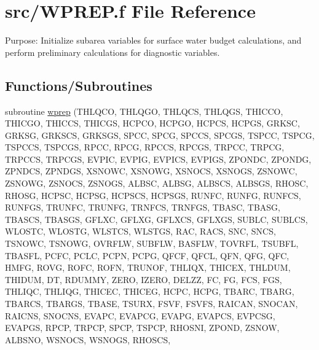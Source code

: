 \hypertarget{WPREP_8f}{}\section{src/\+W\+P\+R\+E\+P.f File Reference}
\label{WPREP_8f}


Purpose\+: Initialize subarea variables for surface water budget calculations, and perform preliminary calculations for diagnostic variables.  


\subsection*{Functions/\+Subroutines}
\begin{DoxyCompactItemize}
\item 
subroutine \hyperlink{WPREP_8f_a8bd6e495bd4674e569184609d67fa736}{wprep} (T\+H\+L\+Q\+C\+O, T\+H\+L\+Q\+G\+O, T\+H\+L\+Q\+C\+S, T\+H\+L\+Q\+G\+S, T\+H\+I\+C\+C\+O, T\+H\+I\+C\+G\+O, T\+H\+I\+C\+C\+S, T\+H\+I\+C\+G\+S, H\+C\+P\+C\+O, H\+C\+P\+G\+O, H\+C\+P\+C\+S, H\+C\+P\+G\+S, G\+R\+K\+S\+C, G\+R\+K\+S\+G, G\+R\+K\+S\+C\+S, G\+R\+K\+S\+G\+S, S\+P\+C\+C, S\+P\+C\+G, S\+P\+C\+C\+S, S\+P\+C\+G\+S, T\+S\+P\+C\+C, T\+S\+P\+C\+G, T\+S\+P\+C\+C\+S, T\+S\+P\+C\+G\+S, R\+P\+C\+C, R\+P\+C\+G, R\+P\+C\+C\+S, R\+P\+C\+G\+S, T\+R\+P\+C\+C, T\+R\+P\+C\+G, T\+R\+P\+C\+C\+S, T\+R\+P\+C\+G\+S, E\+V\+P\+I\+C, E\+V\+P\+I\+G, E\+V\+P\+I\+C\+S, E\+V\+P\+I\+G\+S, Z\+P\+O\+N\+D\+C, Z\+P\+O\+N\+D\+G, Z\+P\+N\+D\+C\+S, Z\+P\+N\+D\+G\+S, X\+S\+N\+O\+W\+C, X\+S\+N\+O\+W\+G, X\+S\+N\+O\+C\+S, X\+S\+N\+O\+G\+S, Z\+S\+N\+O\+W\+C, Z\+S\+N\+O\+W\+G, Z\+S\+N\+O\+C\+S, Z\+S\+N\+O\+G\+S, A\+L\+B\+S\+C, A\+L\+B\+S\+G, A\+L\+B\+S\+C\+S, A\+L\+B\+S\+G\+S, R\+H\+O\+S\+C, R\+H\+O\+S\+G, H\+C\+P\+S\+C, H\+C\+P\+S\+G, H\+C\+P\+S\+C\+S, H\+C\+P\+S\+G\+S, R\+U\+N\+F\+C, R\+U\+N\+F\+G, R\+U\+N\+F\+C\+S, R\+U\+N\+F\+G\+S, T\+R\+U\+N\+F\+C, T\+R\+U\+N\+F\+G, T\+R\+N\+F\+C\+S, T\+R\+N\+F\+G\+S, T\+B\+A\+S\+C, T\+B\+A\+S\+G, T\+B\+A\+S\+C\+S, T\+B\+A\+S\+G\+S, G\+F\+L\+X\+C, G\+F\+L\+X\+G, G\+F\+L\+X\+C\+S, G\+F\+L\+X\+G\+S, S\+U\+B\+L\+C, S\+U\+B\+L\+C\+S, W\+L\+O\+S\+T\+C, W\+L\+O\+S\+T\+G, W\+L\+S\+T\+C\+S, W\+L\+S\+T\+G\+S, R\+A\+C, R\+A\+C\+S, S\+N\+C, S\+N\+C\+S, T\+S\+N\+O\+W\+C, T\+S\+N\+O\+W\+G, O\+V\+R\+F\+L\+W, S\+U\+B\+F\+L\+W, B\+A\+S\+F\+L\+W, T\+O\+V\+R\+F\+L, T\+S\+U\+B\+F\+L, T\+B\+A\+S\+F\+L, P\+C\+F\+C, P\+C\+L\+C, P\+C\+P\+N, P\+C\+P\+G, Q\+F\+C\+F, Q\+F\+C\+L, Q\+F\+N, Q\+F\+G, Q\+F\+C, H\+M\+F\+G, R\+O\+V\+G, R\+O\+F\+C, R\+O\+F\+N, T\+R\+U\+N\+O\+F, T\+H\+L\+I\+Q\+X, T\+H\+I\+C\+E\+X, T\+H\+L\+D\+U\+M, T\+H\+I\+D\+U\+M, D\+T, R\+D\+U\+M\+M\+Y, Z\+E\+R\+O, I\+Z\+E\+R\+O, D\+E\+L\+Z\+Z, F\+C, F\+G, F\+C\+S, F\+G\+S, T\+H\+L\+I\+Q\+C, T\+H\+L\+I\+Q\+G, T\+H\+I\+C\+E\+C, T\+H\+I\+C\+E\+G, H\+C\+P\+C, H\+C\+P\+G, T\+B\+A\+R\+C, T\+B\+A\+R\+G, T\+B\+A\+R\+C\+S, T\+B\+A\+R\+G\+S, T\+B\+A\+S\+E, T\+S\+U\+R\+X, F\+S\+V\+F, F\+S\+V\+F\+S, R\+A\+I\+C\+A\+N, S\+N\+O\+C\+A\+N, R\+A\+I\+C\+N\+S, S\+N\+O\+C\+N\+S, E\+V\+A\+P\+C, E\+V\+A\+P\+C\+G, E\+V\+A\+P\+G, E\+V\+A\+P\+C\+S, E\+V\+P\+C\+S\+G, E\+V\+A\+P\+G\+S, R\+P\+C\+P, T\+R\+P\+C\+P, S\+P\+C\+P, T\+S\+P\+C\+P, R\+H\+O\+S\+N\+I, Z\+P\+O\+N\+D, Z\+S\+N\+O\+W, A\+L\+B\+S\+N\+O, W\+S\+N\+O\+C\+S, W\+S\+N\+O\+G\+S, R\+H\+O\+S\+C\+S, 
\end{DoxyCompactItemize}
